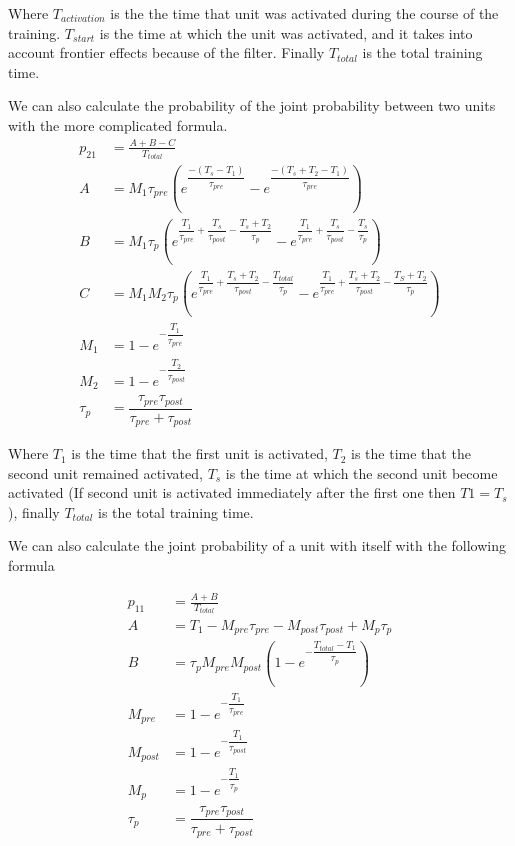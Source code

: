 \documentclass[10pt,a4paper]{article}
\begin{document}
Where $T_{activation}$ is the the time that unit was activated during the course of the training. $T_{start}$ is the time at which the unit was activated, and it takes into account frontier effects because of the filter. Finally $T_{total}$ is the total training time.

We can also calculate the probability of the joint probability between two units with the more complicated formula. 
\begin{align*}
p_{21} &= \frac{A  + B  - C}{T_{total}} \\
A & = M_1  \tau_{pre} \left( e^{\dfrac{-(T_s - T_1)}{\tau_{pre}}} - e^{\dfrac{-(T_s + T_2 - T_1)}{\tau_{pre}}}  \right) \\
B &= M_1 \tau_p \left(e^{\dfrac{T_1}{\tau_{pre}} + \dfrac{T_s}{\tau_{post}} - \dfrac{T_s + T_2}{\tau_p}} - e^{\dfrac{T_1}{\tau_{pre}} + \dfrac{T_s}{\tau_{post}} - \dfrac{T_s}{\tau_p}}   \right) \\
C &=  M_1 M_2 \tau_p \left(e^{\dfrac{T_1}{\tau_{pre}} + \dfrac{T_s + T_2}{\tau_{post}} -\dfrac{T_{total}}{\tau_p}} - e^{\dfrac{T_1}{\tau_{pre}} + \dfrac{T_s + T_2}{\tau_{post}} -\dfrac{T_S + T_2}{\tau_p}} \right)  \\
M_1 & =  1 - e^{-\dfrac{T_1}{\tau_{pre}}} \\ 
M_2 & = 1 - e^{-\dfrac{T_2}{\tau_{post}}} \\
\tau_p &=  \dfrac{\tau_{pre} \tau_{post}}{\tau_{pre} + \tau_{post}}
\end{align*}

Where $T_1$ is the time that the first unit is activated, $T_2$ is the time that the second unit remained activated, $T_s$ is the time at which the second unit become activated (If second unit is activated immediately after the first one then $T1=T_s$), finally $T_{total}$ is the total training time. 

We can also calculate the joint probability of a unit with itself with the following formula

\begin{align*}
p_{11} &= \frac{A + B}{T_{total}} \\
A &= T_1 -  M_{pre} \tau_{pre} - M_{post} \tau_{post} + M_p \tau_p  \\
B &= \tau_p M_{pre} M_{post} \left( 1 - e^{-\dfrac{T_{total} - T_1}{\tau_p}} \right) \\ 
M_{pre} &= 1 - e^{-\dfrac{T_1}{\tau_{pre}}} \\ 
M_{post} &= 1 - e^{-\dfrac{T_1}{\tau_{post}}} \\
M_p &= 1 - e^{-\dfrac{T_1}{\tau_{p}}} \\
\tau_p &= \dfrac{\tau_{pre} \tau_{post}}{\tau_{pre} + \tau_{post}}
\end{align*}
\end{document}
